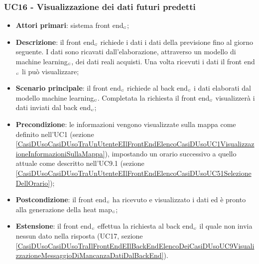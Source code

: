 \subsubsection{UC16 - Visualizzazione dei dati futuri predetti}\label{CasiDUsoCasiDUsoTraIlFrontEndEIlBackEndElencoDeiCasiDUsoUC83VisualizzazioneDeiDatiPredetti}
\begin{itemize}
	\item \textbf{Attori primari}: sistema front end$_{\scaleto{G}{3pt}}$;
	\item \textbf{Descrizione}: il front end$_{\scaleto{G}{3pt}}$ richiede i dati i dati della previsione fino al giorno seguente.
	I dati sono ricavati dall’elaborazione, attraverso un modello di machine learning$_{\scaleto{G}{3pt}}$, dei dati reali acquisti. Una volta ricevuti i dati il front end$_{\scaleto{G}{3pt}}$ li può visualizzare;
	\item \textbf{Scenario principale}: il front end$_{\scaleto{G}{3pt}}$ richiede al back end$_{\scaleto{G}{3pt}}$ i dati elaborati dal modello machine learning$_{\scaleto{G}{3pt}}$. Completata la richiesta il front end$_{\scaleto{G}{3pt}}$ visualizzerà i dati inviati dal back end$_{\scaleto{G}{3pt}}$;
	\item \textbf{Precondizione}: le informazioni vengono visualizzate sulla mappa come definito nell’UC1 (sezione \ref{CasiDUsoCasiDUsoTraUnUtenteEIlFrontEndElencoCasiDUsoUC1VisualizzazioneInformazioniSullaMappa}), impostando un orario successivo a quello attuale come descritto nell’UC9.1 (sezione \ref{CasiDUsoCasiDUsoTraUnUtenteEIlFrontEndElencoCasiDUsoUC51SelezioneDellOrario});
	\item \textbf{Postcondizione}: il front end$_{\scaleto{G}{3pt}}$ ha ricevuto e visualizzato i dati ed è pronto alla generazione della heat map$_{\scaleto{G}{3pt}}$;
	\item \textbf{Estensione}: il front end$_{\scaleto{G}{3pt}}$ effettua la richiesta al back end$_{\scaleto{G}{3pt}}$ il quale non invia nessun dato nella risposta (UC17, sezione \ref{CasiDUsoCasiDUsoTraIlFrontEndEIlBackEndElencoDeiCasiDUsoUC9VisualizzazioneMessaggioDiMancanzaDatiDalBackEnd}).
\end{itemize}

